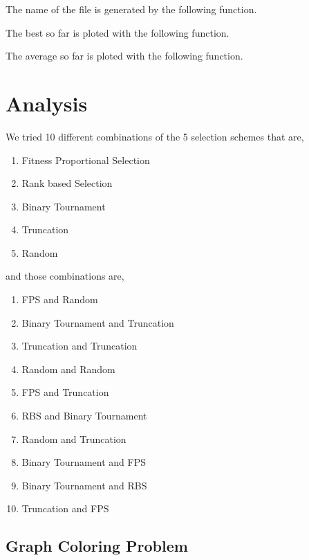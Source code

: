 \documentclass[12pt]{report}
\theoremstyle{mytheoremstyle}
\theoremstyle{mytheoremstyle}
\theoremstyle{myproblemstyle}
\begin{document}
\newpage

The name of the file is generated by the following function.

The best so far is ploted with the following function.


\newpage

The average so far is ploted with the following function.


\newpage

\chapter{Analysis}
We tried 10 different combinations of the 5 selection schemes that are,
\begin{enumerate}
	\item Fitness Proportional Selection
	\item Rank based Selection
	\item Binary Tournament
	\item Truncation
	\item Random
\end{enumerate}

and those combinations are,
\begin{enumerate}
	\item FPS and Random
	\item Binary Tournament and Truncation
	\item Truncation and Truncation
	\item Random and Random
	\item FPS and Truncation
	\item RBS and Binary Tournament
	\item Random and Truncation
	\item Binary Tournament and FPS
	\item Binary Tournament and RBS
	\item Truncation and FPS
\end{enumerate}


\section{Graph Coloring Problem}
\end{document}
